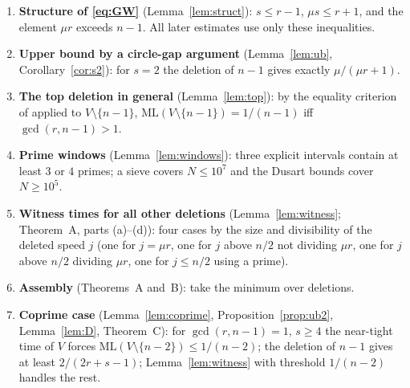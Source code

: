 \documentclass[11pt]{article}
\theoremstyle{remark}
\newcommand{\ML}{\mathrm{ML}}
\begin{document}
\begin{enumerate}
\item \textbf{Structure of \eqref{eq:GW}} (Lemma~\ref{lem:struct}): $s\le r-1$, $\mu s\le r+1$, and the element $\mu r$ exceeds $n-1$. All later estimates use only these inequalities.
\item \textbf{Upper bound by a circle-gap argument} (Lemma~\ref{lem:ub}, Corollary~\ref{cor:s2}): for $s=2$ the deletion of $n-1$ gives exactly $\mu/(\mu r+1)$.
\item \textbf{The top deletion in general} (Lemma~\ref{lem:top}): by the equality criterion of \cite{GW06} applied to $V\setminus\{n-1\}$, $\ML(V\setminus\{n-1\})=1/(n-1)$ iff $\gcd(r,n-1)>1$.
\item \textbf{Prime windows} (Lemma~\ref{lem:windows}): three explicit intervals contain at least $3$ or $4$ primes; a sieve covers $N\le10^7$ and the Dusart bounds cover $N\ge10^5$.
\item \textbf{Witness times for all other deletions} (Lemma~\ref{lem:witness}; Theorem~A, parts (a)--(d)): four cases by the size and divisibility of the deleted speed $j$ (one for $j=\mu r$, one for $j$ above $n/2$ not dividing $\mu r$, one for $j$ above $n/2$ dividing $\mu r$, one for $j\le n/2$ using a prime).
\item \textbf{Assembly} (Theorems~A and~B): take the minimum over deletions.
\item \textbf{Coprime case} (Lemma~\ref{lem:coprime}, Proposition~\ref{prop:ub2}, Lemma~\ref{lem:D}, Theorem~C): for $\gcd(r,n-1)=1$, $s\ge4$ the near-tight time of $V$ forces $\ML(V\setminus\{n-2\})\le1/(n-2)$; the deletion of $n-1$ gives at least $2/(2r+s-1)$; Lemma~\ref{lem:witness} with threshold $1/(n-2)$ handles the rest.
\end{enumerate}
\end{document}
